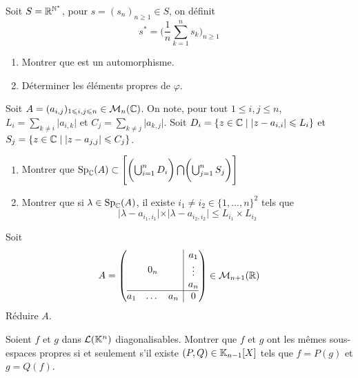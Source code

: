 \begin{exercise}
	Soit $S=\mathbb{R}^{\mathbb{N}^{*}}$, pour $s=(s_{n})_{n\geqslant1}\in S$, on définit 
	$$s^{*}=\Biggl(\frac{1}{n}\sum_{k=1}^{n}s_{k}\Biggr)_{n\geqslant1}$$
	\begin{enumerate}
		\item Montrer que  est un automorphisme.
		\item Déterminer les éléments propres de $\varphi$.
	\end{enumerate}
\end{exercise}

\begin{exercise}
	Soit $A=(a_{i,j})_{1\leqslant i,j\leqslant n}\in\mathcal{M}_{n}(\mathbb{C})$. On note, pour tout $1\leqslant i,j\leqslant n$, $L_{i}=\sum_{k\neq i}\vert a_{i,k}\vert$ et $C_{j}=\sum_{k\neq j}\vert a_{k,j}\vert$. Soit $D_{i}=\{z\in\mathbb{C}\mid\vert z-a_{i,i}\vert\leqslant L_{i}\}$ et $S_{j}=\{z\in\mathbb{C}\mid\vert z-a_{j,j}\vert\leqslant C_{j}\}$.
	\begin{enumerate}
		\item Montrer que $\operatorname{Sp}_{\mathbb{C}}(A)\subset\Biggl[\biggl(\bigcup_{i=1}^{n}D_{i}\biggr)\bigcap \biggl(\bigcup_{j=1}^{n}S_{j}\biggr)\Biggr]$
		\item Montrer que si $\lambda\in\operatorname{Sp}_{\mathbb{C}}(A)$, il existe $i_{1}\neq i_{2}\in\{1,\dots,n\}^{2}$ tels que 
		$$\vert\lambda-a_{i_{1},i_{1}}\vert\times\vert\lambda-a_{i_{2},i_{2}}\vert\leqslant L_{i_{1}}\times L_{i_{2}}$$
	\end{enumerate}
\end{exercise}

\begin{exercise}
	Soit 
	$$
	A=
	\left(
		\begin{array}{@{}c|c@{}}
		0_{n} &
		\begin{matrix}
			a_{1}\\
			\vdots\\
			a_{n}
			\end{matrix}
			\\
		\hline
		\begin{matrix}
			a_{1} &
			\dots
			& a_{n}
			\end{matrix}
			& 0
		\end{array}
		\right)\in \M_{n+1}(\R)
	$$
	Réduire $A$.
\end{exercise}

\begin{exercise}
	Soient $f$ et $g$ dans $\mathcal{L}(\mathbb{K}^{n})$ diagonalisables. Montrer que $f$ et $g$ ont les mêmes sous-espaces propres si et seulement s'il existe $(P,Q)\in\mathbb{K}_{n-1}[X]$ tels que $f=P(g)$ et $g=Q(f)$.
\end{exercise}

